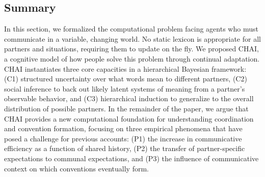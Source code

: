 \subsection{Summary}

In this section, we formalized the computational problem facing agents who must communicate in a variable, changing world. 
No static lexicon is appropriate for all partners and situations, requiring them to update on the fly. 
We proposed CHAI, a cognitive model of how people solve this problem through continual adaptation.
CHAI instantiates three core capacities in a hierarchical Bayesian framework: (C1) structured uncertainty over what words mean to different partners, (C2) social inference to back out likely latent systems of meaning from a partner's observable behavior, and (C3) hierarchical induction to generalize to the overall distribution of possible partners. 
In the remainder of the paper, we argue that CHAI provides a new computational foundation for understanding coordination and convention formation, focusing on three empirical phenomena that have posed a challenge for previous accounts: (P1) the increase in communicative efficiency as a function of shared history, (P2) the transfer of partner-specific expectations to communal expectations, and (P3) the influence of communicative context on which conventions eventually form.
